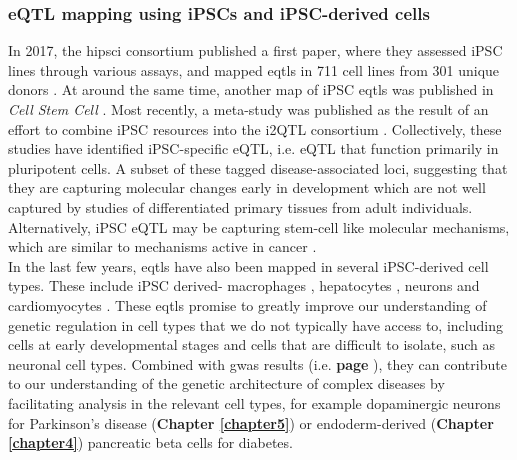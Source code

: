 \subsubsection{eQTL mapping using iPSCs and iPSC-derived cells}

In 2017, the \gls{hipsci} consortium published a first paper, where they assessed iPSC lines through various assays, and mapped \glspl{eqtl} in 711 cell lines from 301 unique donors \cite{kilpinen2017common}.
At around the same time, another map of iPSC \glspl{eqtl} was published in \textit{Cell Stem Cell} \cite{deboever2017large}.
Most recently, a meta-study was published as the result of an effort to combine iPSC resources into the i2QTL consortium \cite{bonder2019systematic}.
Collectively, these studies have identified iPSC-specific eQTL, i.e. eQTL that function primarily in pluripotent cells.
A subset of these tagged disease-associated loci, suggesting that they are capturing molecular changes early in development which are not well captured by studies of differentiated primary tissues from adult individuals. 
Alternatively, iPSC eQTL may be capturing stem-cell like molecular mechanisms, which are similar to mechanisms active in cancer \cite{kilpinen2017common}. \\

In the last few years, \glspl{eqtl} have also been mapped in several iPSC-derived cell types.
These include iPSC derived-
macrophages \cite{alasoo2018shared},
hepatocytes \cite{pashos2017large},
neurons \cite{schwartzentruber2018molecular}
and
cardiomyocytes \cite{strober2019dynamic, banovich2018impact}.
These \glspl{eqtl} promise to greatly improve our understanding of genetic regulation in cell types that we do not typically have access to, including cells at early developmental stages and cells that are difficult to isolate, such as neuronal cell types.
Combined with \gls{gwas} results (i.e. \textbf{page \pageref{sec:eqtl_gwas}}), they can contribute to our understanding of the genetic architecture of complex diseases by facilitating analysis in the relevant cell types, for example dopaminergic neurons for Parkinson's disease (\textbf{Chapter
\ref{chapter5}})
or endoderm-derived (\textbf{Chapter 
\ref{chapter4}})
pancreatic beta cells for diabetes.


